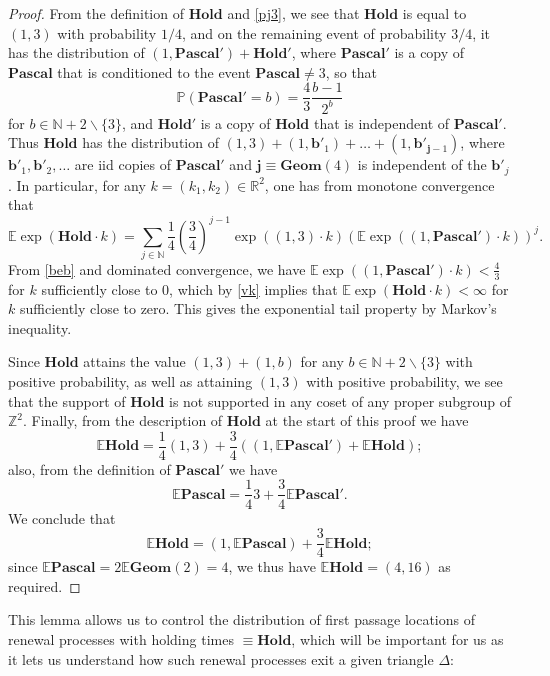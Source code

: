 \documentclass[12pt,a4paper,reqno]{amsart}
\numberwithin{equation}{section}
\theoremstyle{plain}
\theoremstyle{definition}
\renewcommand\P{\mathbb{P}}
\newcommand\E{\mathbb{E}}
\newcommand\R{\mathbb{R}}
\newcommand\Z{\mathbb{Z}}
\newcommand\N{\mathbb{N}}
\renewcommand\b{\mathbf{b}}
\renewcommand\j{\mathbf{j}}
\newcommand\Geom{\mathbf{Geom}}
\newcommand\Pascal{\mathbf{Pascal}}
\newcommand\Hold{\mathbf{Hold}}
\begin{document}
\begin{proof}  From the definition of $\Hold$ and \eqref{pj3}, we see that $\Hold$ is equal to $(1,3)$ with probability $1/4$, and on the remaining event of probability $3/4$, it has the distribution of $(1,\Pascal') + \Hold'$, where $\Pascal'$ is a copy of $\Pascal$ that is conditioned to the event $\Pascal \neq 3$, so that
\begin{equation}\label{beb}
 \P( \Pascal' = b ) = \frac{4}{3} \frac{b-1}{2^b}
\end{equation}
for $b \in \N+2 \backslash \{3\}$, and $\Hold'$ is a copy of $\Hold$ that is independent of $\Pascal'$.   Thus $\Hold$ has the distribution of $(1,3) + (1,\b'_1) + \dots + (1,\b'_{\j-1})$, where $\b'_1,\b'_2,\dots$ are iid copies of $\Pascal'$ and $\j \equiv \Geom(4)$ is independent of the $\b'_j$.  In particular, for any $k = (k_1,k_2) \in \R^2$, one has from monotone convergence that
\begin{equation}\label{vk}
\E \exp( \Hold \cdot k ) = \sum_{j \in \N} \frac{1}{4} \left(\frac{3}{4}\right)^{j-1} \exp\left( (1,3) \cdot k\right) \left(\E \exp( (1,\Pascal') \cdot k) \right)^j.
\end{equation}
From \eqref{beb} and dominated convergence, we have $\E \exp( (1,\Pascal') \cdot k ) < \frac{4}{3}$ for $k$ sufficiently close to $0$, which by \eqref{vk} implies that $\E \exp( \Hold \cdot k ) < \infty$ for $k$ sufficiently close to zero.  This gives the exponential tail property by Markov's inequality.

Since $\Hold$ attains the value $(1,3)+(1,b)$ for any $b \in \N+2 \backslash \{3\}$ with positive probability, as well as attaining $(1,3)$ with positive probability, we see that the support of $\Hold$ is not supported in any coset of any proper subgroup of $\Z^2$.  Finally, from the description of $\Hold$ at the start of this proof we have
$$ \E \Hold = \frac{1}{4} (1,3) + \frac{3}{4} \left((1,\E \Pascal') + \E \Hold\right);$$
also, from the definition of $\Pascal'$ we have
$$ \E \Pascal = \frac{1}{4} 3 + \frac{3}{4} \E \Pascal'.$$
We conclude that
$$ \E \Hold = (1,\E \Pascal) + \frac{3}{4} \E \Hold;$$
since $\E \Pascal = 2 \E \Geom(2) =4$, we thus have $\E \Hold = (4,16)$ as required.
\end{proof}

This lemma allows us to control the distribution of first passage locations of renewal processes with holding times $\equiv \Hold$, which will be important for us as it lets us understand how such renewal processes exit a given triangle $\Delta$:
\end{document}
